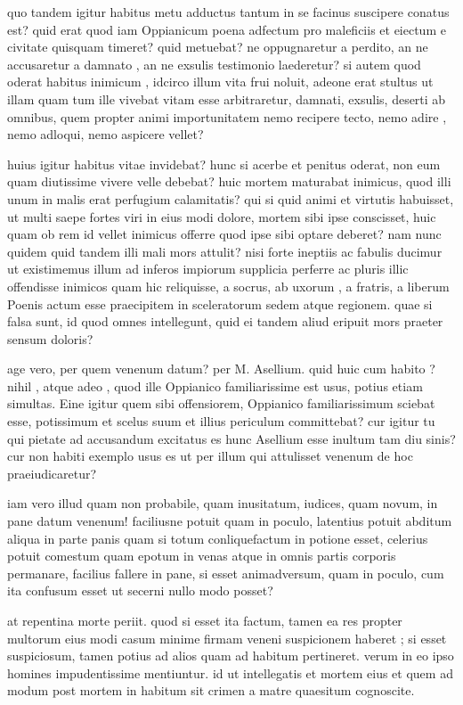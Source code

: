  quo tandem igitur habitus metu adductus tantum in se facinus suscipere conatus est? quid erat quod iam Oppianicum poena adfectum pro maleficiis et eiectum e civitate quisquam timeret? quid metuebat? ne oppugnaretur a perdito, an ne accusaretur a damnato , an ne exsulis testimonio laederetur? si autem quod oderat habitus inimicum , idcirco illum vita frui noluit, adeone erat stultus ut illam quam tum ille vivebat vitam esse arbitraretur, damnati, exsulis, deserti ab omnibus, quem propter animi importunitatem nemo recipere tecto, nemo adire , nemo adloqui, nemo aspicere vellet?

 huius igitur habitus vitae invidebat? hunc si acerbe et penitus oderat, non eum quam diutissime vivere velle debebat? huic mortem maturabat inimicus, quod illi unum in malis erat perfugium calamitatis? qui si quid animi et virtutis habuisset, ut multi saepe fortes viri in eius modi dolore, mortem sibi ipse conscisset, huic quam ob rem id vellet inimicus offerre quod ipse sibi optare deberet? nam nunc quidem quid tandem illi mali mors attulit? nisi forte ineptiis ac fabulis ducimur ut existimemus illum ad inferos impiorum supplicia perferre ac pluris illic offendisse inimicos quam hic reliquisse, a socrus, ab uxorum , a fratris, a liberum Poenis actum esse praecipitem in sceleratorum sedem atque regionem. quae si falsa sunt, id quod omnes intellegunt, quid ei tandem aliud eripuit mors praeter sensum doloris?

 age vero, per quem venenum datum? per M. Asellium. quid huic cum habito ? nihil , atque adeo , quod ille Oppianico familiarissime est usus, potius etiam simultas. Eine igitur quem sibi offensiorem, Oppianico familiarissimum sciebat esse, potissimum et scelus suum et illius periculum committebat? cur igitur tu qui pietate ad accusandum excitatus es hunc Asellium esse inultum tam diu sinis? cur non habiti exemplo usus es ut per illum qui attulisset venenum de hoc praeiudicaretur?

 iam vero illud quam non probabile, quam inusitatum, iudices, quam novum, in pane datum venenum! faciliusne potuit quam in poculo, latentius potuit abditum aliqua in parte panis quam si totum conliquefactum in potione esset, celerius potuit comestum quam epotum in venas atque in omnis partis corporis permanare, facilius fallere in pane, si esset animadversum, quam in poculo, cum ita confusum esset ut secerni nullo modo posset?

 at repentina morte periit. quod si esset ita factum, tamen ea res propter multorum eius modi casum minime firmam veneni suspicionem haberet ; si esset suspiciosum, tamen potius ad alios quam ad habitum pertineret. verum in eo ipso homines impudentissime mentiuntur. id ut intellegatis et mortem eius et quem ad modum post mortem in habitum sit crimen a matre quaesitum cognoscite.

